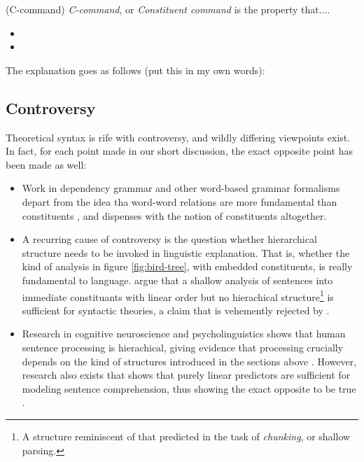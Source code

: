 \begin{definition}{(C-command)} \textit{C-command}, or \textit{Constituent command} is the property that....
  \begin{itemize}
    \item
    \item
  \end{itemize}
\end{definition}

The explanation goes as follows (put this in my own words): 


\subsection{Controversy}
Theoretical syntax is rife with controversy, and wildly differing viewpoints exist. In fact, for each point made in our short discussion, the exact opposite point has been made as well:

\begin{itemize}

  \item Work in dependency grammar and other word-based grammar formalisms depart from the idea tha word-word relations are more fundamental than constituents \citep{tesniere1959elements,nivre2005dependency,hudson2010introduction}, and dispenses with the notion of constituents altogether.

  \item A recurring cause of controversy is the question whether hierarchical structure needs to be invoked in linguistic explanation. That is, whether the kind of analysis in figure \ref{fig:bird-tree}, with embedded constituents, is really fundamental to language. \citet{frank2012hierarchical} argue that a shallow analysis of sentences into immediate constituants with linear order but no hierachical structure\footnote{A structure reminiscent of that predicted in the task of \textit{chunking}, or shallow parsing.} is sufficient for syntactic theories, a claim that is vehemently rejected by \citet{everaert2015structures}.

  \item Research in cognitive neuroscience and psycholinguistics shows that human sentence processing is hierachical, giving evidence that processing crucially depends on the kind of structures introduced in the sections above \citep{hale2001earley,levy2008expectation,brennan2016abstract}. However, research also exists that shows that purely linear predictors are sufficient for modeling sentence comprehension, thus showing the exact opposite to be true \citep{conway2008neurocognitive,gillespie2011hierarchy,christiansen2012similar,gillespie2013against,frank2012hierarchical}.

\end{itemize}

